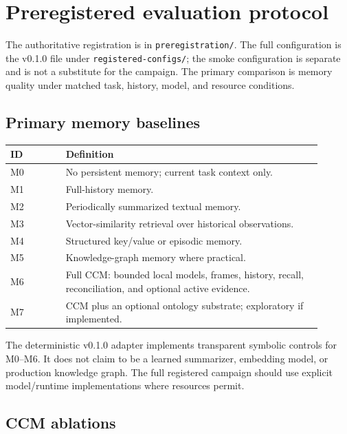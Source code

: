 \section{Preregistered evaluation protocol}

The authoritative registration is in \texttt{preregistration/}. The full configuration is the v0.1.0 file under \texttt{registered-configs/}; the smoke configuration is separate and is not a substitute for the campaign. The primary comparison is memory quality under matched task, history, model, and resource conditions.

\subsection{Primary memory baselines}

\scriptsize
\begin{longtable}{@{}p{0.16\linewidth}p{0.74\linewidth}@{}}
\toprule
ID & Definition \\
\midrule
M0 & No persistent memory; current task context only. \\
M1 & Full-history memory. \\
M2 & Periodically summarized textual memory. \\
M3 & Vector-similarity retrieval over historical observations. \\
M4 & Structured key/value or episodic memory. \\
M5 & Knowledge-graph memory where practical. \\
M6 & Full CCM: bounded local models, frames, history, recall, reconciliation, and optional active evidence. \\
M7 & CCM plus an optional ontology substrate; exploratory if implemented. \\
\bottomrule
\end{longtable}
\normalsize

The deterministic v0.1.0 adapter implements transparent symbolic controls for M0--M6. It does not claim to be a learned summarizer, embedding model, or production knowledge graph. The full registered campaign should use explicit model/runtime implementations where resources permit.

\subsection{CCM ablations}

